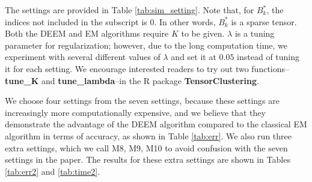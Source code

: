 \documentclass[11pt]{article}
\begin{document}
The settings are provided in Table \ref{tab:sim_setting}. Note that, for ${B}^*_{k}$, the indices not included in the subscript is $0$. In other words, ${B}^*_k$ is a sparse tensor. Both the DEEM and EM algorithms require $K$ to be given. $\lambda$ is a tuning parameter for regularization; however, due to the long computation time, we experiment with several different values of $\lambda$ and set it at $0.05$ instead of tuning it for each setting. We encourage interested readers to try out two functions--\textbf{tune\_K} and \textbf{tune\_lambda}--in the R package \textbf{TensorClustering}. 

We choose four settings from the seven settings, because these settings are increasingly more computationally expensive, and we believe that they demonstrate the advantage of the DEEM algorithm compared to the classical EM algorithm in terms of accuracy, as shown in Table \ref{tab:err}. We also run three extra settings, which we call M8, M9, M10 to avoid confusion with the seven settings in the paper. The results for these extra settings are shown in Tables \ref{tab:err2} and \ref{tab:time2}.
\end{document}
